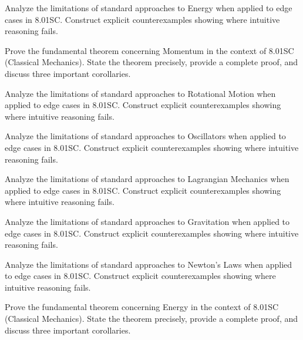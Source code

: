 \documentclass[12pt,a4paper]{exam}
\begin{document}
\begin{questions}
\vspace{0.3cm}

\question[4]
Analyze the limitations of standard approaches to Energy when applied to edge cases in 8.01SC. Construct explicit counterexamples showing where intuitive reasoning fails.

\vspace{0.3cm}

\question[3]
Prove the fundamental theorem concerning Momentum in the context of 8.01SC (Classical Mechanics). State the theorem precisely, provide a complete proof, and discuss three important corollaries.

\vspace{0.3cm}

\question[5]
Analyze the limitations of standard approaches to Rotational Motion when applied to edge cases in 8.01SC. Construct explicit counterexamples showing where intuitive reasoning fails.

\vspace{0.3cm}

\question[4]
Analyze the limitations of standard approaches to Oscillators when applied to edge cases in 8.01SC. Construct explicit counterexamples showing where intuitive reasoning fails.

\vspace{0.3cm}

\question[5]
Analyze the limitations of standard approaches to Lagrangian Mechanics when applied to edge cases in 8.01SC. Construct explicit counterexamples showing where intuitive reasoning fails.

\vspace{0.3cm}

\question[4]
Analyze the limitations of standard approaches to Gravitation when applied to edge cases in 8.01SC. Construct explicit counterexamples showing where intuitive reasoning fails.

\vspace{0.3cm}

\question[6]
Analyze the limitations of standard approaches to Newton's Laws when applied to edge cases in 8.01SC. Construct explicit counterexamples showing where intuitive reasoning fails.

\vspace{0.3cm}

\question[3]
Prove the fundamental theorem concerning Energy in the context of 8.01SC (Classical Mechanics). State the theorem precisely, provide a complete proof, and discuss three important corollaries.


\end{questions}
\end{document}

